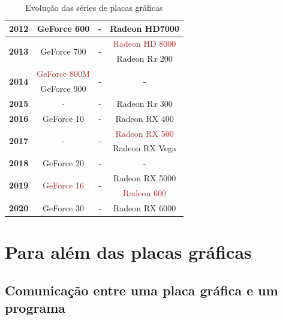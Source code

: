 \documentclass{report}
\begin{document}
\begin{table}[h]
\begin{tabular}{|c|c|c|c|}
    \textbf{2012} & GeForce 600    & -              & Radeon HD7000          \\ \hline
    \multirow{2}{*}{\textbf{2013}} & \multirow{2}{*}{GeForce 700}    & \multirow{2}{*}{-}              & \textcolor{brown}{Radeon HD 8000} \\ \cline{4-4}
     & \multirow{2}{*}{} & \multirow{2}{*}{} & Radeon R\textit{x} 200 \\ \hline
    \multirow{2}{*}{\textbf{2014}} & \textcolor{brown}{GeForce 800M}    & \multirow{2}{*}{-}  & \multirow{2}{*}{-}       \\ \cline{2-2}
                                   & GeForce 900    & \multirow{2}{*}{}   & \multirow{2}{*}{} \\ \hline
    \textbf{2015} & -              & -              & Radeon R\textit{x} 300 \\ \hline
    \textbf{2016} & GeForce 10     & -              & Radeon RX 400          \\ \hline
    \multirow{2}{*}{\textbf{2017}} & \multirow{2}{*}{-}    & \multirow{2}{*}{-}              & \textcolor{brown}{Radeon RX 500} \\ \cline{4-4}
     & \multirow{2}{*}{} & \multirow{2}{*}{} & Radeon RX Vega \\ \hline
    \textbf{2018} & GeForce 20     & -              & -                      \\ \hline
    \multirow{2}{*}{\textbf{2019}} & \multirow{2}{*}{\textcolor{brown}{GeForce 16}}    & \multirow{2}{*}{-}              & Radeon RX 5000 \\ \cline{4-4}
     & \multirow{2}{*}{} & \multirow{2}{*}{} & \textcolor{brown}{Radeon 600} \\ \hline
    \textbf{2020} & GeForce 30     & -              & Radeon RX 6000         \\ \hline
    
\end{tabular}
\caption{Evolução das séries de placas gráficas\label{tab:tab2}}
\end{table}


\chapter{Para além das placas gráficas}
\section{Comunicação entre uma placa gráfica e um programa}
\end{document}
